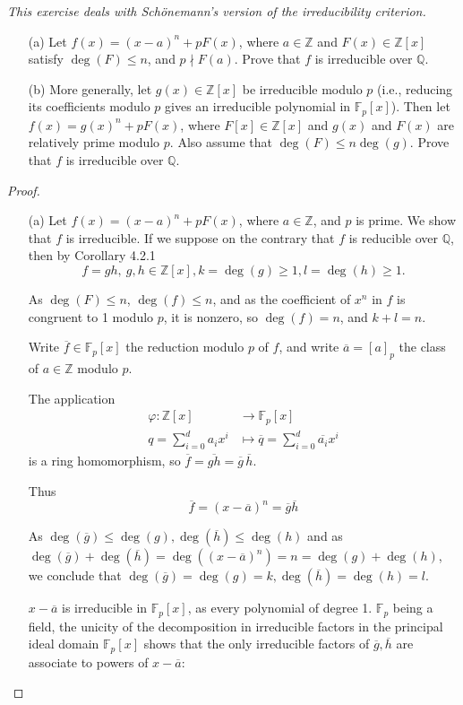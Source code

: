 \documentclass[11pt,a4paper]{article}
\newcommand{\Q}{\mathbb{Q}}
\newcommand{\Z}{\mathbb{Z}}
\newcommand{\F}{\mathbb{F}}
\begin{document}
{\it This exercise deals with Sch\"onemann's version of the irreducibility criterion.
\begin{enumerate}
\item[(a)] Let $f(x) = (x-a)^n + pF(x)$, where $a\in \Z$ and $F(x) \in \Z[x]$ satisfy $\deg(F) \leq n$, and $p\nmid F(a)$. Prove that $f$ is irreducible over $\Q$.
\item[(b)] More generally, let $g(x) \in \Z[x]$ be irreducible modulo $p$ (i.e., reducing its coefficients modulo $p$ gives an irreducible polynomial in $\F_p[x]$). Then let $f(x) = g(x)^n + pF(x)$, where $F[x] \in \Z[x]$ and $g(x)$ and $F(x)$ are relatively prime modulo $p$. Also assume that $\deg(F) \leq n \deg(g)$. Prove that $f$ is irreducible over $\Q$.
\end{enumerate}
}

\begin{proof}
\begin{enumerate}
\item[(a)]
Let $f(x) = (x-a)^n + pF(x)$, where $a\in \mathbb{Z}$, and $p$ is prime. We show that $f$ is irreducible. If we suppose on the contrary that $f$ is reducible over $\Q$, then by Corollary 4.2.1  $$f = g h,\ g,h \in \mathbb{Z}[x], k = \deg(g)\geq 1,l=\deg(h) \geq 1.$$

As $\deg(F) \leq n$, $\deg(f)\leq n$, and as the coefficient of $x^n$ in $f$ is congruent to 1 modulo $p$, it is nonzero, so $\deg(f) = n$, and $k+l=n$.

Write $\overline{f} \in \mathbb{F}_p[x]$ the reduction modulo $p$ of $f$, and write $\overline{a} = [a]_p$ the class of $a\in \mathbb{Z}$ modulo $p$. 

The application 
\begin{align*}
\varphi : \mathbb{Z}[x] &\to \mathbb{F}_p[x]\\
q= \sum_{i=0}^d a_i x^i &\mapsto \overline{q} =  \sum_{i=0}^d \overline{a_i} x^i 
 \end{align*}
is a ring homomorphism, so  $\overline{f} = \overline{gh} = \overline{g}\,\overline{h}$.
 
Thus $$\overline{f} = (x- \overline{a})^n = \overline{g}\overline{h}$$
 
As $\deg(\overline{g}) \leq \deg(g), \deg(\overline{h}) \leq \deg(h)$ and as $\deg(\overline{g})+\deg(\overline{h}) = \deg((x- \overline{a})^n)=n = \deg(g)+ \deg(h)$, we conclude that $\deg(\overline{g}) = \deg(g) = k, \deg(\overline{h})=\deg(h)=l$.
 
 $x-\overline{a}$ is irreducible in $\mathbb{F}_p[x]$, as every polynomial of degree 1. $\mathbb{F}_p$ being a field, the unicity of the decomposition in irreducible factors in  the principal ideal domain $\mathbb{F}_p[x]$ shows that the only irreducible factors of $\overline{g}, \overline{h}$ are associate to powers of $x-\overline{a}$: 
 

\end{enumerate}
\end{proof}
\end{document}
